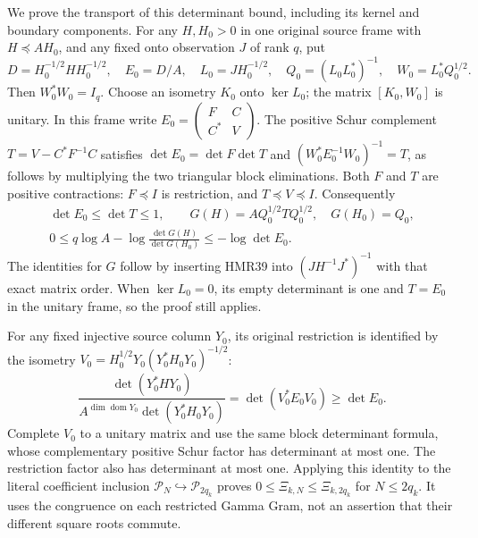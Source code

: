\documentclass[11pt,a4paper]{article}
\newcommand{\C}{\mathbb C}
\begin{document}
We prove the transport of this determinant bound, including
its kernel and boundary components. For any $H,H_0>0$ in
one original source frame with $H\preceq A H_0$, and any
fixed onto observation $J$ of rank $q$, put
\[
 D=H_0^{-1/2}HH_0^{-1/2},\quad E_0=D/A,\quad
 L_0=JH_0^{-1/2},\quad Q_0=(L_0L_0^*)^{-1},\quad
 W_0=L_0^*Q_0^{1/2}.
 \tag{HMR39}
\]
Then $W_0^*W_0=I_q$. Choose an isometry $K_0$ onto
$\ker L_0$; the matrix $[K_0,W_0]$ is unitary. In this
frame write
$E_0=\left(\begin{smallmatrix}F&C\\C^*&V\end{smallmatrix}\right)$.
The positive Schur complement $T=V-C^*F^{-1}C$ satisfies
$\det E_0=\det F\det T$ and
$(W_0^*E_0^{-1}W_0)^{-1}=T$, as follows by multiplying
the two triangular block eliminations. Both $F$ and $T$
are positive contractions: $F\preceq I$ is restriction,
and $T\preceq V\preceq I$. Consequently
\[
\begin{gathered}
 \det E_0\leq\det T\leq1,\qquad
 G(H)=A Q_0^{1/2}TQ_0^{1/2},\quad G(H_0)=Q_0,\\
 0\leq q\log A-\log\frac{\det G(H)}{\det G(H_0)}
       \leq-\log\det E_0 .
\end{gathered}\tag{HMR40}
\]
The identities for $G$ follow by inserting HMR39 into
$(JH^{-1}J^*)^{-1}$ with that exact matrix order.
When $\ker L_0=0$, its empty determinant is one and
$T=E_0$ in the unitary frame, so the proof still applies.

For any fixed injective source column $Y_0$, its original
restriction is identified by the isometry
$V_0=H_0^{1/2}Y_0(Y_0^*H_0Y_0)^{-1/2}$:
\[
 \frac{\det(Y_0^*HY_0)}
 {A^{\dim\operatorname{dom}Y_0}\det(Y_0^*H_0Y_0)}
       =\det(V_0^*E_0V_0)\geq\det E_0.
\]
Complete $V_0$ to a unitary matrix and use the same block
determinant formula, whose complementary positive Schur
factor has determinant at most one. The restriction factor
also has determinant at most one. Applying this identity to
the literal coefficient inclusion $\mathcal P_N\hookrightarrow
\mathcal P_{2q_k}$ proves
$0\leq\Xi_{k,N}\leq\Xi_{k,2q_k}$ for $N\leq2q_k$.
It uses the congruence on each restricted Gamma Gram,
not an assertion that their different square roots commute.
\end{document}
